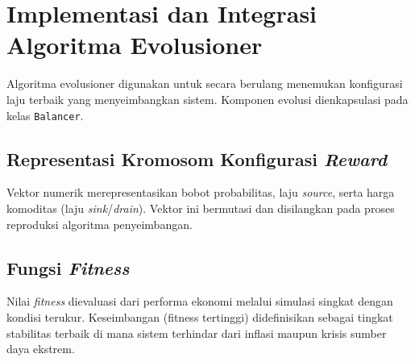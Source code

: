 


\section{Implementasi dan Integrasi Algoritma Evolusioner}
Algoritma evolusioner digunakan untuk secara berulang menemukan konfigurasi laju terbaik yang menyeimbangkan sistem. Komponen evolusi dienkapsulasi pada kelas \texttt{Balancer}.

\subsection{Representasi Kromosom Konfigurasi \textit{Reward}}
Vektor numerik merepresentasikan bobot probabilitas, laju \textit{source}, serta harga komoditas (laju \textit{sink}/\textit{drain}). Vektor ini bermutasi dan disilangkan pada proses reproduksi algoritma penyeimbangan.

\subsection{Fungsi \textit{Fitness}}
Nilai \textit{fitness} dievaluasi dari performa ekonomi melalui simulasi singkat dengan kondisi terukur. Keseimbangan (fitness tertinggi) didefinisikan sebagai tingkat stabilitas terbaik di mana sistem terhindar dari inflasi maupun krisis sumber daya ekstrem.

